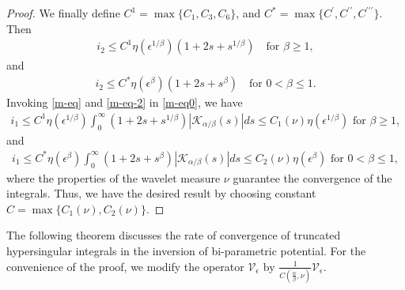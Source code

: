 \documentclass[11pt,a4paper,reqno]{amsproc}
\theoremstyle{definition}
\theoremstyle{remark}
\numberwithin{equation}{section}
\begin{document}
\begin{proof}
\noindent We finally define 
 $C^1= \max\{C_1, C_3, C_6 \}$, and $C^*=\max \{C^\prime, C^{\prime\prime},C^{\prime\prime\prime} \}$. Then
\begin{align} \label{m-eq}
    i_2 \leq C^1\eta(\epsilon^{1/\beta})\left( 1+2s+s^{1/\beta} \right) \quad \text{for } \beta\geq 1,
\end{align} and 
\begin{align} \label{m-eq-2}
    i_2 \leq C^*\eta(\epsilon^{\beta})\left( 1+2s+s^{\beta} \right) \quad \text{for }0< \beta\leq 1.
\end{align}
 Invoking \eqref{m-eq} and \eqref{m-eq-2} in \eqref{m-eq0},  we have
\begin{align*}
     i_1  \leq C^1\eta(\epsilon^{1/\beta}) \int_0^\infty  \left( 1+2s+s^{1/\beta} \right)\left|\mathcal{K}_{\alpha/\beta}(s)\right|ds \leq C_1(\nu)\eta(\epsilon^{1/\beta}) \text{  for } \beta\geq 1,
\end{align*} 
and 
\begin{align*}
     i_1 \leq C^*\eta(\epsilon^{\beta}) \int_0^\infty  \left( 1+2s+s^{\beta} \right)\left|\mathcal{K}_{\alpha/\beta}(s)\right|ds \leq C_2(\nu)\eta(\epsilon^{\beta}) \text{ 
 for } 0<\beta\leq 1,
\end{align*}
where the properties of the wavelet measure $\nu$ guarantee the convergence of the integrals. Thus, we have the desired result by choosing constant \( C =\max\{C_1(\nu),C_2(\nu)\}\).
\end{proof}

The following theorem discusses the rate of convergence of truncated hypersingular integrals in the inversion of bi-parametric potential. For the convenience of the proof, we modify the operator $\mathcal{V}_\epsilon$ by $\frac{1}{C\left(\frac{\alpha}{\beta},\nu\right)}\mathcal{V}_\epsilon$. 
\end{document}
